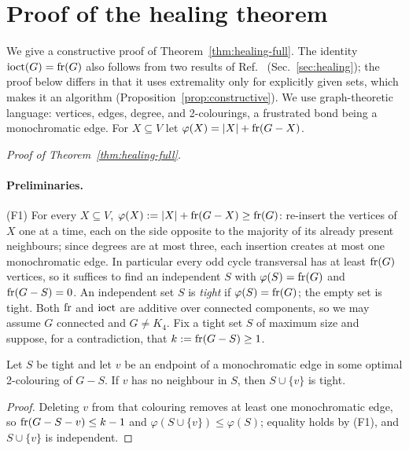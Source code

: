 
\section{Proof of the healing theorem}
\label{app:healing}
We give a constructive proof of Theorem~\ref{thm:healing-full}. The identity $\operatorname{ioct}(G)=\operatorname{fr}(G)$
also follows from two results of Ref.~\cite{Akbari2022} (Sec.~\ref{sec:healing}); the proof
below differs in that it uses extremality only for explicitly given sets, which makes it an
algorithm (Proposition~\ref{prop:constructive}).
We use graph-theoretic language: vertices, edges, degree, and 2-colourings, a frustrated bond being
a monochromatic edge. For $X\subseteq V$ let $\varphi(X)=|X|+\operatorname{fr}(G-X)$.

\emph{Proof of Theorem~\ref{thm:healing-full}.}
\paragraph*{Preliminaries.}
(F1) For every $X\subseteq V$, $\varphi(X):=|X|+\operatorname{fr}(G-X)\ge\operatorname{fr}(G)$: re-insert the vertices of $X$
one at a time, each on the side opposite to the majority of its already present neighbours;
since degrees are at most three, each insertion creates at most one monochromatic edge.
In particular every odd cycle transversal has at least $\operatorname{fr}(G)$ vertices, so it suffices to
find an independent $S$ with $\varphi(S)=\operatorname{fr}(G)$ and $\operatorname{fr}(G-S)=0$.
An independent set $S$ is \emph{tight} if $\varphi(S)=\operatorname{fr}(G)$; the empty set is tight.
Both $\operatorname{fr}$ and $\operatorname{ioct}$ are additive over connected components, so we may assume $G$
connected and $G\ne K_4$. Fix a tight set $S$ of maximum size and suppose, for a
contradiction, that $k:=\operatorname{fr}(G-S)\ge1$.

\begin{lemma}[augmentation]\label{lem:aug}
Let $S$ be tight and let $v$ be an endpoint of a monochromatic edge in some optimal
2-colouring of $G-S$. If $v$ has no neighbour in $S$, then $S\cup\{v\}$ is tight.
\end{lemma}
\begin{proof}
Deleting $v$ from that colouring removes at least one monochromatic edge, so
$\operatorname{fr}(G-S-v)\le k-1$ and $\varphi(S\cup\{v\})\le\varphi(S)$; equality holds by (F1), and
$S\cup\{v\}$ is independent.
\end{proof}

